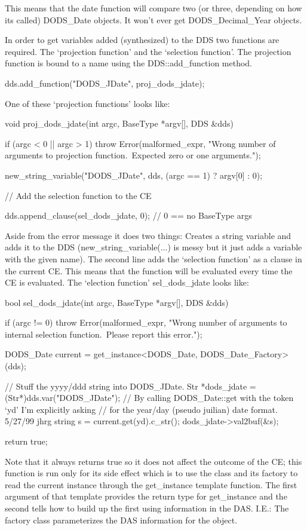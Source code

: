 \documentclass[12pt]{article}
\begin{document}
This means that the date function will compare two (or three, depending on
how its called) DODS_Date objects. It won't ever get DODS_Decimal_Year
objects.

In order to get variables added (synthesized) to the DDS two functions
are required. The `projection function' and the `selection function'. The
projection function is bound to a name using the DDS::add_function method.

    dds.add_function("DODS_JDate", proj_dods_jdate);

One of these `projection functions' looks like:

    void
    proj_dods_jdate(int argc, BaseType *argv[], DDS &dds)
    {
        if (argc < 0 || argc > 1)
            throw Error(malformed_expr,
    "Wrong number of arguments to projection function.\n\
    Expected zero or one arguments.");

        new_string_variable("DODS_JDate", dds, (argc == 1) ? argv[0] : 0);

        // Add the selection function to the CE

        dds.append_clause(sel_dods_jdate, 0); // 0 == no BaseType args

    }

Aside from the error message it does two things: Creates a string variable
and adds it to the DDS (new_string_variable(...) is messy but it just adds
a variable with the given name). The second line adds the `selection function'
as a clause in the current CE. This means that the function will be evaluated
every time the CE is evaluated. The `election function' sel_dods_jdate looks
like:

    bool
    sel_dods_jdate(int argc, BaseType *argv[], DDS &dds)
    {
        if (argc != 0)
            throw Error(malformed_expr,
    "Wrong number of arguments to internal selection function.\n\
    Please report this error.");

        DODS_Date current = get_instance<DODS_Date, DODS_Date_Factory>(dds);

        // Stuff the yyyy/ddd string into DODS_JDate.
        Str *dods_jdate = (Str*)dds.var("DODS_JDate");
        // By calling DODS_Date::get with the token `yd' I'm explicitly asking
        // for the year/day (pseudo juilian) date format. 5/27/99 jhrg
        string s = current.get(yd).c_str();
        dods_jdate->val2buf(&s);

        return true;
    }

Note that it always returns true so it does not affect the outcome of the CE;
this function is run only for its side effect which is to use the class and
its factory to read the current instance through the get_instance template
function. The first argument of that template provides the return type for
get_instance and the second tells how to build up the first using information
in the DAS. I.E.: The factory class parameterizes the DAS information for the
object.
\end{document}
